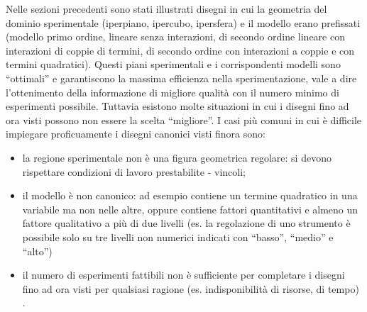 \documentclass[
  11pt,
]{book}
\providecommand{\tightlist}{%
  \setlength{\itemsep}{0pt}\setlength{\parskip}{0pt}}
\begin{document}
Nelle sezioni precedenti sono stati illustrati disegni in cui la geometria del dominio sperimentale (iperpiano, ipercubo, ipersfera) e il modello erano prefissati (modello primo ordine, lineare senza interazioni, di secondo ordine lineare con interazioni di coppie di termini, di secondo ordine con interazioni a coppie e con termini quadratici). Questi piani sperimentali e i corrispondenti modelli sono ``ottimali'' e garantiscono la massima efficienza nella sperimentazione, vale a dire l'ottenimento della informazione di migliore qualità con il numero minimo di esperimenti possibile.
Tuttavia esistono molte situazioni in cui i disegni fino ad ora visti possono non essere la scelta ``migliore''. I casi più comuni in cui è difficile impiegare proficuamente i disegni canonici visti finora sono:

\begin{itemize}
\tightlist
\item
  la regione sperimentale non è una figura geometrica regolare: si devono rispettare condizioni di lavoro prestabilite - vincoli;
\item
  il modello è non canonico: ad esempio contiene un termine quadratico in una variabile ma non nelle altre, oppure contiene fattori quantitativi e almeno un fattore qualitativo a più di due livelli (es. la regolazione di uno strumento è possibile solo su tre livelli non numerici indicati con ``basso'', ``medio'' e ``alto'')
\item
  il numero di esperimenti fattibili non è sufficiente per completare i disegni fino ad ora visti per qualsiasi ragione (es. indisponibilità di risorse, di tempo) .
\end{itemize}
\end{document}
